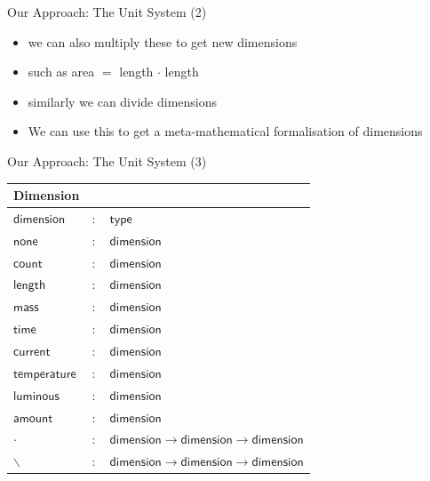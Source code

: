 \documentclass{beamer}
\begin{document}
  \begin{frame}{Our Approach: The Unit System (2)}
    \begin{itemize}[<+->]
      \item we can also multiply these to get new dimensions
      \item such as area $=$ length $\cdot{}$ length
      \item similarly we can divide dimensions
      \item We can use this to get a meta-mathematical formalisation of dimensions
    \end{itemize}
  \end{frame}
  \begin{frame}{Our Approach: The Unit System (3)}
      \begin{center}
        \begin{tabular}{|l c l|}
          \hline
          \textsf{Dimension} & &\\\hline
          $\mathsf{dimension}$ & $:$ & $ \mathsf{type}$\\

          $\mathsf{none}$ & $:$ & $ \mathsf{dimension}$\\
          $\mathsf{count}$ & $:$ & $ \mathsf{dimension}$\\
          $\mathsf{length}$ & $:$ & $ \mathsf{dimension}$\\
          $\mathsf{mass}$ & $:$ & $ \mathsf{dimension}$\\
          $\mathsf{time}$ & $:$ & $ \mathsf{dimension}$\\
          $\mathsf{current}$ & $:$ & $ \mathsf{dimension}$\\
          $\mathsf{temperature}$ & $:$ & $ \mathsf{dimension}$\\
          $\mathsf{luminous}$ & $:$ & $ \mathsf{dimension}$\\
          $\mathsf{amount}$ & $:$ & $ \mathsf{dimension}$\\

          $\cdot{}$ & $:$ & $ \mathsf{dimension} \rightarrow \mathsf{dimension} \rightarrow \mathsf{dimension}$\\
          $\backslash$ & $:$ & $ \mathsf{dimension} \rightarrow \mathsf{dimension} \rightarrow \mathsf{dimension}$\\\hline
        \end{tabular}
    \end{center}
  \end{frame}
\end{document}
